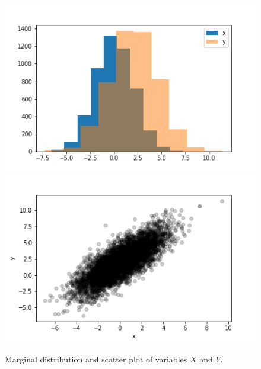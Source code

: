 \documentclass[BCOR=1mm, DIV=calc,10pt,
twoside=true,
twocolumn,
headings=normal]{scrartcl}
\begin{document}
\begin{figure}
\begin{center}
\includegraphics[scale=0.5]{../figures/marginal} \includegraphics[scale=0.5]{../figures/scatter}
\caption{\label{fig:scatter} Marginal distribution and scatter plot of variables $X$ and $Y$.}
\end{center}
\end{figure}
\end{document}

